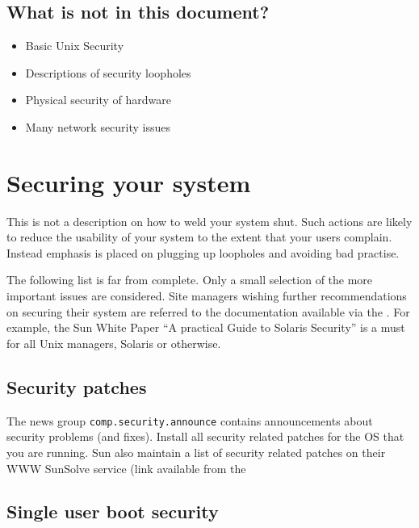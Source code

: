 \subsection{What is not in this document?}

\begin{itemize}
\item Basic Unix Security
\item Descriptions of security loopholes
\item Physical security of hardware
\item Many network security issues
\end{itemize}


\section{\label{securing_your_system}Securing your system}

This is not a description on how to weld your system shut. 
Such actions are likely to reduce the usability of your system
to the extent that your users complain. Instead emphasis is placed
on plugging up loopholes and avoiding bad practise. 

The following list is far from complete. Only a small selection of the more
important issues are considered. Site managers wishing further
recommendations on securing their system are referred to the
documentation available via the .  For
example, the Sun White Paper ``A practical Guide to Solaris Security''
is a must for all Unix managers, Solaris or otherwise.


\subsection{Security patches}

The news group {\tt comp.security.announce} contains announcements
about security problems (and fixes). Install all security related
patches for the OS that you are running. Sun also maintain a list of
security related patches on their WWW SunSolve service (link available
from the 

\subsection{Single user boot security}

